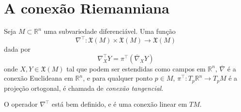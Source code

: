 \section{A conexão Riemanniana}

\begin{definicao}
	Seja $M \subset \mathbb{R}^n$ uma subvariedade diferenciável. Uma função
	\begin{equation*}
		\nabla^\top: \mathfrak{X}(M) \times \mathfrak{X}(M) \rightarrow \mathfrak{X}(M)
	\end{equation*}
	dada por
	\begin{equation*}
		\nabla^\top_X Y = \pi^\top \left( \overline{\nabla}_X Y \right)
	\end{equation*}
	onde $X,Y \in \mathfrak{X}(M)$ tal que podem ser estendidas como campos em $\mathbb{R}^n$, $\overline{\nabla}$ é a conexão Euclideana em $\mathbb{R}^n$, e para qualquer ponto $p \in M$, $\pi^\top: T_p \mathbb{R}^n \rightarrow T_p M$ é a projeção ortogonal, é chamada de \emph{conexão tangencial}.
\end{definicao}

\begin{lema}
	O operador $\nabla^\top$ está bem definido, e é uma conexão linear em $TM$.
\end{lema}

